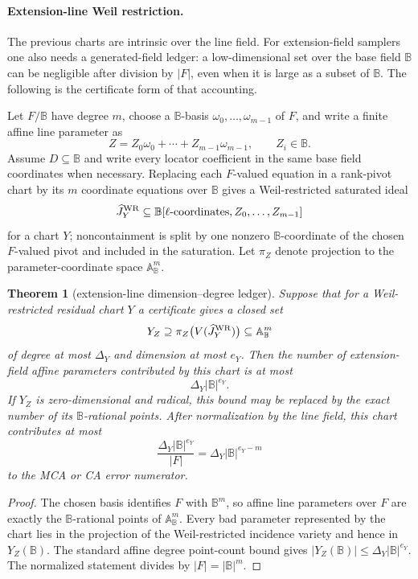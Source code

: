 \documentclass[11pt]{article}
\newtheorem{theorem}{Theorem}[section]
\theoremstyle{definition}
\theoremstyle{remark}
\newcommand{\B}{\mathbb{B}}
\begin{document}
\paragraph{Extension-line Weil restriction.}
The previous charts are intrinsic over the line field.  For extension-field
samplers one also needs a generated-field ledger: a low-dimensional set over the
base field $\B$ can be negligible after division by $|F|$, even when it is large
as a subset of $\B$.  The following is the certificate form of that accounting.

Let $F/\B$ have degree $m$, choose a $\B$-basis
$\omega_0,\ldots,\omega_{m-1}$ of $F$, and write a finite affine line parameter
as
\[
        Z=Z_0\omega_0+\cdots+Z_{m-1}\omega_{m-1},
        \qquad Z_i\in\B .
\]
Assume $D\subseteq\B$ and write every locator coefficient in the same base field
coordinates when necessary.  Replacing each $F$-valued equation in a rank-pivot
chart by its $m$ coordinate equations over $\B$ gives a Weil-restricted saturated
ideal
\[
        \widehat J^{\rm WR}_{Y}
        \subseteq
        \B[\ell\text{-coordinates},Z_0,\ldots,Z_{m-1}]
\]
for a chart $Y$; noncontainment is split by one nonzero $\B$-coordinate of the
chosen $F$-valued pivot and included in the saturation.
Let $\pi_Z$ denote projection to the parameter-coordinate space
$\mathbb A^m_{\B}$.

\begin{theorem}[extension-line dimension--degree ledger]
\label{thm:extension-line-dimension-degree-ledger}
Suppose that for a Weil-restricted residual chart $Y$ a certificate gives a
closed set
\[
        Y_Z\supseteq \pi_Z\bigl(V(\widehat J^{\rm WR}_{Y})\bigr)
        \subseteq \mathbb A^m_{\B}
\]
of degree at most $\Delta_Y$ and dimension at most $e_Y$.  Then the number of
extension-field affine parameters contributed by this chart is at most
\[
        \Delta_Y |\B|^{e_Y}.
\]
If $Y_Z$ is zero-dimensional and radical, this bound may be replaced by the
exact number of its $\B$-rational points.  After normalization by the line field,
this chart contributes at most
\[
        \frac{\Delta_Y |\B|^{e_Y}}{|F|}
        =\Delta_Y |\B|^{e_Y-m}
\]
to the MCA or CA error numerator.
\end{theorem}

\begin{proof}
The chosen basis identifies $F$ with $\B^m$, so affine line parameters over $F$
are exactly the $\B$-rational points of $\mathbb A^m_{\B}$.  Every bad parameter
represented by the chart lies in the projection of the Weil-restricted incidence
variety and hence in $Y_Z(\B)$.  The standard affine degree point-count bound gives
$|Y_Z(\B)|\le\Delta_Y|\B|^{e_Y}$.  The normalized statement divides by
$|F|=|\B|^m$.
\end{proof}
\end{document}

